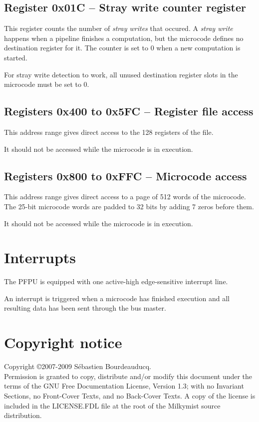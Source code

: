 \documentclass[a4paper,11pt]{article}
\begin{document}
\subsection{Register 0x01C -- Stray write counter register}
This register counts the number of \textit{stray writes} that occured. A \textit{stray write} happens when a pipeline finishes a computation, but the microcode defines no destination register for it. The counter is set to 0 when a new computation is started.

For stray write detection to work, all unused destination register slots in the microcode must be set to 0.

\subsection{Registers 0x400 to 0x5FC -- Register file access}
This address range gives direct access to the 128 registers of the file.

It should not be accessed while the microcode is in execution.

\subsection{Registers 0x800 to 0xFFC -- Microcode access}
This address range gives direct access to a page of 512 words of the microcode. The 25-bit microcode words are padded to 32 bits by adding 7 zeros before them.

It should not be accessed while the microcode is in execution.

\section{Interrupts}
The PFPU is equipped with one active-high edge-sensitive interrupt line.

An interrupt is triggered when a microcode has finished execution and all resulting data has been sent through the bus master.

\section*{Copyright notice}
Copyright \copyright 2007-2009 S\'ebastien Bourdeauducq. \\
Permission is granted to copy, distribute and/or modify this document under the terms of the GNU Free Documentation License, Version 1.3; with no Invariant Sections, no Front-Cover Texts, and no Back-Cover Texts. A copy of the license is included in the LICENSE.FDL file at the root of the Milkymist source distribution.
\end{document}

